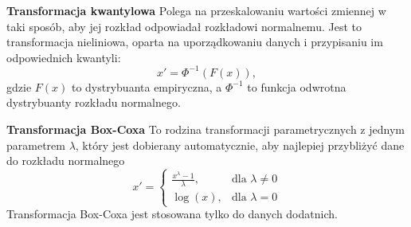 \documentclass[12pt,a4paper]{article}
\begin{document}
\vspace{2mm}
\textbf{Transformacja kwantylowa}
Polega na przeskalowaniu wartości zmiennej w taki sposób, aby jej rozkład odpowiadał rozkładowi normalnemu. Jest to transformacja nieliniowa, oparta na uporządkowaniu danych i przypisaniu im odpowiednich kwantyli:
$$x'=\Phi^{-1}(F(x)),$$
gdzie $F(x)$ to dystrybuanta empiryczna, a $\Phi^{-1}$ to funkcja odwrotna dystrybuanty rozkładu normalnego.

\vspace{2mm}
\textbf{Transformacja Box-Coxa}
To rodzina transformacji parametrycznych z jednym parametrem 
$\lambda$, który jest dobierany automatycznie, aby najlepiej przybliżyć dane do rozkładu normalnego
$$x'=\begin{cases}
\frac{x^\lambda-1}{\lambda}, & \text{dla } \lambda \neq 0 \\
\log(x), & \text{dla } \lambda = 0
\end{cases}$$
Transformacja Box-Coxa jest stosowana tylko do danych dodatnich.
\end{document}
